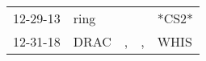 \begin{supertabular}{p{0.07\textwidth}p{0.06\textwidth}p{0.02\textwidth}p{0.02\textwidth}p{0.06\textwidth}}
 12-29-13\textsuperscript{} &  ring\textsuperscript{} &    &    &                   *CS2* \\
 12-31-18\textsuperscript{} &  DRAC\textsuperscript{} &  , &  , &  WHIS\textsuperscript{} \\
\end{supertabular}
